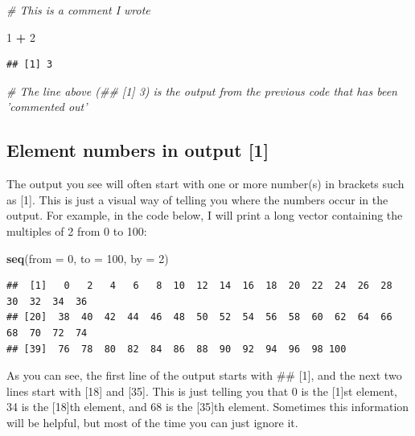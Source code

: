 \documentclass[
]{book}
\newenvironment{Shaded}{\begin{snugshade}}{\end{snugshade}}
\newcommand{\CommentTok}[1]{\textcolor[rgb]{0.56,0.35,0.01}{\textit{#1}}}
\newcommand{\DataTypeTok}[1]{\textcolor[rgb]{0.13,0.29,0.53}{#1}}
\newcommand{\DecValTok}[1]{\textcolor[rgb]{0.00,0.00,0.81}{#1}}
\newcommand{\KeywordTok}[1]{\textcolor[rgb]{0.13,0.29,0.53}{\textbf{#1}}}
\newcommand{\NormalTok}[1]{#1}
\newcommand{\OperatorTok}[1]{\textcolor[rgb]{0.81,0.36,0.00}{\textbf{#1}}}
\newcommand{\StringTok}[1]{\textcolor[rgb]{0.31,0.60,0.02}{#1}}
\begin{document}
\begin{Shaded}
\begin{Highlighting}[]
\CommentTok{# This is a comment I wrote}

\DecValTok{1} \OperatorTok{+}\StringTok{ }\DecValTok{2}
\end{Highlighting}
\end{Shaded}

\begin{verbatim}
## [1] 3
\end{verbatim}

\begin{Shaded}
\begin{Highlighting}[]
\CommentTok{# The line above (## [1] 3) is the output from the previous code that has been 'commented out'}
\end{Highlighting}
\end{Shaded}

\hypertarget{element-numbers-in-output-1}{%
\subsection{Element numbers in output {[}1{]}}\label{element-numbers-in-output-1}}

The output you see will often start with one or more number(s) in brackets such as {[}1{]}. This is just a visual way of telling you where the numbers occur in the output. For example, in the code below, I will print a long vector containing the multiples of 2 from 0 to 100:

\begin{Shaded}
\begin{Highlighting}[]
\KeywordTok{seq}\NormalTok{(}\DataTypeTok{from =} \DecValTok{0}\NormalTok{, }\DataTypeTok{to =} \DecValTok{100}\NormalTok{, }\DataTypeTok{by =} \DecValTok{2}\NormalTok{)}
\end{Highlighting}
\end{Shaded}

\begin{verbatim}
##  [1]   0   2   4   6   8  10  12  14  16  18  20  22  24  26  28  30  32  34  36
## [20]  38  40  42  44  46  48  50  52  54  56  58  60  62  64  66  68  70  72  74
## [39]  76  78  80  82  84  86  88  90  92  94  96  98 100
\end{verbatim}

As you can see, the first line of the output starts with \#\# {[}1{]}, and the next two lines start with {[}18{]} and {[}35{]}. This is just telling you that 0 is the {[}1{]}st element, 34 is the {[}18{]}th element, and 68 is the {[}35{]}th element. Sometimes this information will be helpful, but most of the time you can just ignore it.
\end{document}
